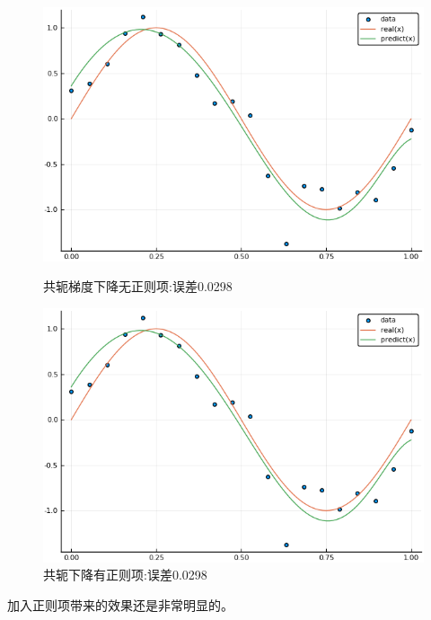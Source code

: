 \documentclass{ML}
\begin{document}
\begin{figure}[H]
	\begin{minipage}[c]{0.5\linewidth}
		\centering
		\includegraphics[width=0.9\linewidth]{media/20/ConjugationNoLambda}
		\caption{共轭梯度下降无正则项:误差0.0298} %
		\label{fig:connolambda20}
	\end{minipage}
	\begin{minipage}[c]{0.5\linewidth}
		\centering
		\includegraphics[width=0.9\linewidth]{media/20/ConjugationWithLambda}
		\caption{共轭下降有正则项:误差0.0298} %
		\label{fig:conwithlambda20}
	\end{minipage}
\end{figure}

加入正则项带来的效果还是非常明显的。

\end{document}
